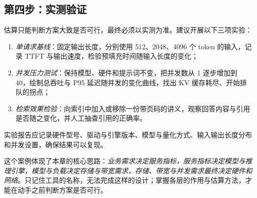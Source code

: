 \subsection{第四步：实测验证}

估算只能判断方案大致是否可行，最终必须以实测为准。建议开展以下三项实验：
\begin{enumerate}
  \item \emph{单请求基线}：固定输出长度，分别使用 512、2048、4096 个 token 的输入，记录 TTFT 与输出速度，检验预填充时间随输入长度的变化；
  \item \emph{并发压力测试}：保持模型、硬件和提示词不变，把并发数从 1 逐步增加到 40，绘制总吞吐与 P95 延迟随并发的变化曲线，找出 KV 缓存耗尽、开始排队的拐点；
  \item \emph{检索效果检验}：向索引中加入或移除一份带页码的讲义，观察回答内容与引用是否随之变化，并人工抽查引用的正确率。
\end{enumerate}
实验报告应记录硬件型号、驱动与引擎版本、模型与量化方式、输入输出长度分布和并发设置，确保结果可以复现。

\begin{keypoints}
这个案例体现了本章的核心思路：\emph{业务需求决定服务指标，服务指标决定模型与推理引擎，模型与负载决定存储与带宽需求，存储、带宽与并发需求最终决定硬件和网络}。只记住工具的名称，无法完成这样的设计；掌握各层的作用与估算方法，才能在动手之前判断方案是否可行。
\end{keypoints}

